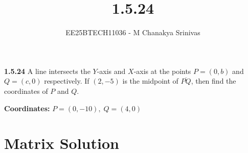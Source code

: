 \documentclass[journal]{IEEEtran}
\begin{document}
	
	
	\vspace{3cm}
	
	\title{1.5.24}
	\author{EE25BTECH11036 - M Chanakya Srinivas}
	\maketitle
	{\let\newpage\relax\maketitle}
	
	\renewcommand{\thefigure}{\theenumi}
	\renewcommand{\thetable}{\theenumi}
	\setlength{\intextsep}{10pt} %
	
	
	\renewcommand{\thetable}{\theenumi}
\textbf{1.5.24}\quad
A line intersects the $Y$-axis and $X$-axis at the points
$P=(0,b)$ and $Q=(c,0)$ respectively. If $(2,-5)$ is the midpoint of
$\overline{PQ}$, then find the coordinates of $P$ and $Q$.


\textbf{Coordinates: } 
$P = (0,-10), \; Q = (4,0)$

\section*{Matrix Solution}
\end{document}
